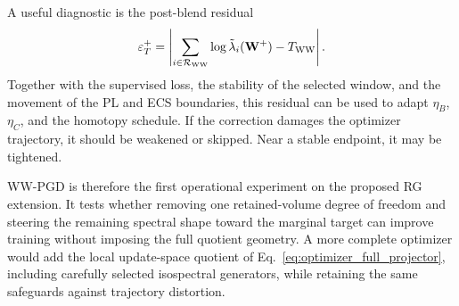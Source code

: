 A useful diagnostic is the post-blend residual
\begin{equation}
  \varepsilon_T^{+}
  =
  \left|
  \sum_{i\in\mathcal R_{\rm WW}}
  \log\tilde\lambda_i(\mathbf W^{+})
  -T_{\rm WW}
  \right|.
  \label{eq:wwpgd_postblend_residual}
\end{equation}
Together with the supervised loss, the stability of the selected window, and the movement of the PL and ECS boundaries, this residual can be used to adapt $\eta_B$, $\eta_C$, and the homotopy schedule.  If the correction damages the optimizer trajectory, it should be weakened or skipped.  Near a stable endpoint, it may be tightened.

WW-PGD is therefore the first operational experiment on the proposed RG extension.  It tests whether removing one retained-volume degree of freedom and steering the remaining spectral shape toward the marginal target can improve training without imposing the full quotient geometry.  A more complete optimizer would add the local update-space quotient of Eq.~\eqref{eq:optimizer_full_projector}, including carefully selected isospectral generators, while retaining the same safeguards against trajectory distortion.
